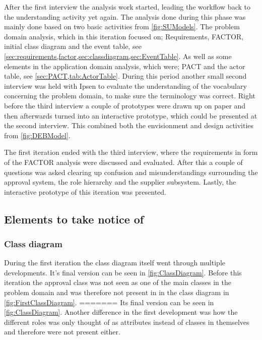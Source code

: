 After the first interview the analysis work started, leading the workflow back to the understanding activity yet again.
The analysis done during this phase was mainly done based on two basic activities from \cref{fig:SUModels}.
The problem domain analysis, which in this iteration focused on; Requirements, FACTOR, initial class diagram and the event table, see \cref{sec:requirements,factor,sec:classdiagram,sec:EventTable}.
As well as some elements in the application domain analysis, which were; PACT and the actor table, see \cref{sec:PACT,tab:ActorTable}.
During this period another small second interview was held with Ipsen to evaluate the understanding of the vocabulary concerning the problem domain, to make sure the terminology was correct.
Right before the third interview a couple of prototypes were drawn up on paper and then afterwards turned into an interactive prototype, which could be presented at the second interview.
This combined both the envisionment and design activities from \cref{fig:DEBModel}.

The first iteration ended with the third interview, where the requirements in form of the FACTOR analysis were discussed and evaluated.
After this a couple of questions was asked clearing up confusion and misunderstandings surrounding the approval system, the role hierarchy and the supplier subsystem.
Lastly, the interactive prototype of this iteration was presented.

\subsection{Elements to take notice of}
\subsubsection*{Class diagram}
During the first iteration the class diagram itself went through multiple developments.
It's final version can be seen in \cref{fig:ClassDiagram}.
Before this iteration the approval class was not seen as one of the main classes in the problem domain and was therefore not present in in the class diagram in \cref{fig:FirstClassDiagram}.
=======
Its final version can be seen in \cref{fig:ClassDiagram}.
Another difference in the first development was how the different roles was only thought of as attributes instead of classes in themselves and therefore were not present either.

